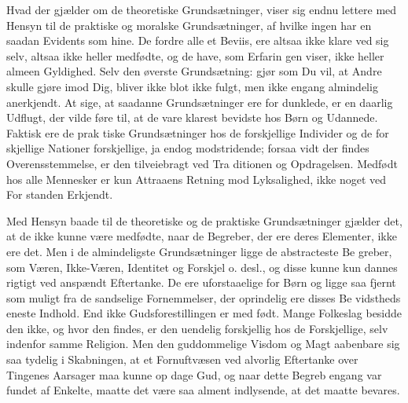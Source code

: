 \documentclass[12pt,a4paper]{book}
\begin{document}
Hvad der gjælder om de theoretiske Grundsætninger, viser
sig endnu lettere med Hensyn til de praktiske og moralske
Grundsætninger, af hvilke ingen har en saadan Evidents som
hine. De fordre alle et Beviis, ere altsaa ikke klare ved sig
selv, altsaa ikke heller medfødte, og de have, som Erfarin\-%
gen viser, ikke heller almeen Gyldighed. Selv den øverste
Grundsætning: gjør som Du vil, at Andre skulle gjøre imod
Dig, bliver ikke blot ikke fulgt, men ikke engang almindelig
anerkjendt. At sige, at saadanne Grundsætninger ere for\-%
dunklede, er en daarlig Udflugt, der vilde føre til, at de vare
klarest bevidste hos Børn og Udannede. Faktisk ere de prak\-%
tiske Grundsætninger hos de forskjellige Individer og de for\-%
skjellige Nationer forskjellige, ja endog modstridende; forsaa\-%
vidt der findes Overensstemmelse, er den tilveiebragt ved Tra\-%
ditionen og Opdragelsen. Medfødt hos alle Mennesker er kun
Attraaens Retning mod Lyksalighed, ikke noget ved For\-%
standen Erkjendt.

Med Hensyn baade til de theoretiske og de praktiske
Grundsætninger gjælder det, at de ikke kunne være medfødte,
naar de Begreber, der ere deres Elementer, ikke ere det. Men
i de almindeligste Grundsætninger ligge de abstracteste Be\-%
greber, som Væren, Ikke-Væren, Identitet og Forskjel o. desl.,
og disse kunne kun dannes rigtigt ved anspændt Eftertanke.
De ere uforstaaelige for Børn og ligge saa fjernt som muligt
fra de sandselige Fornemmelser, der oprindelig ere disses Be\-%
vidstheds eneste Indhold. End ikke Gudsforestillingen er med\-%
født. Mange Folkeslag besidde den ikke, og hvor den findes,
er den uendelig forskjellig hos de Forskjellige, selv indenfor
samme Religion. Men den guddommelige Visdom og Magt
aabenbare sig saa tydelig i Skabningen, at et Fornuftvæsen
ved alvorlig Eftertanke over Tingenes Aarsager maa kunne op\-%
dage Gud, og naar dette Begreb engang var fundet af Enkelte,
maatte det være saa alment indlysende, at det maatte bevares.
\end{document}
